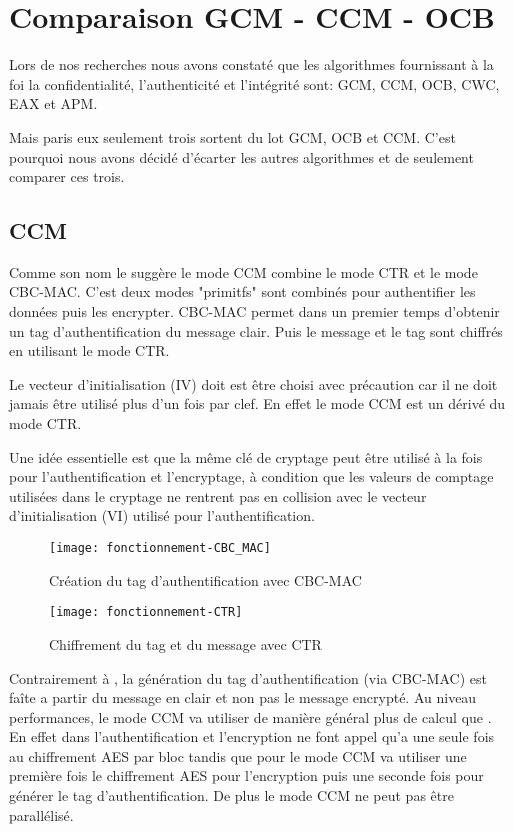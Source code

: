 \chapter{Comparaison GCM - CCM - OCB}

Lors de nos recherches nous avons constaté que les algorithmes fournissant à la foi la confidentialité, l'authenticité et l'intégrité sont: GCM, CCM, OCB, CWC, EAX et APM.

Mais paris eux seulement trois sortent du lot GCM, OCB et CCM. C'est pourquoi nous avons décidé d'écarter les autres algorithmes et de seulement comparer ces trois.

\section{CCM}

Comme son nom le suggère le mode CCM combine le mode CTR et le mode CBC-MAC. C'est deux modes "primitfs" sont combinés pour authentifier les données puis les encrypter. CBC-MAC permet dans un premier temps d'obtenir un tag d'authentification du message clair. Puis le message et le tag sont chiffrés en utilisant le mode CTR.



Le vecteur d'initialisation (IV) doit est être choisi avec précaution car il ne doit jamais être utilisé plus d'un fois par clef. En effet le mode CCM est un dérivé du mode CTR.



Une idée essentielle est que la même clé de cryptage peut être utilisé à la fois pour l'authentification et l'encryptage, à condition que les valeurs de comptage utilisées dans le cryptage ne rentrent pas en collision avec le vecteur d'initialisation (VI) utilisé pour l'authentification.


\begin{figure}[!h]
  \centering
  \texttt{[image: fonctionnement-CBC\_MAC]}
  \caption{Création du tag d'authentification avec CBC-MAC}
  \label{Création du tag d'authentification avec CBC-MAC}
\end{figure}

\begin{figure}[!h]
  \centering
  \texttt{[image: fonctionnement-CTR]}
  \caption{Chiffrement du tag et du message avec CTR}
  \label{Chiffrement du tag et du message avec CTR}
\end{figure}


Contrairement à \aes, la génération du tag d'authentification (via CBC-MAC) est faîte a partir du message en clair et non pas le message encrypté. Au niveau performances, le mode CCM va utiliser de manière général plus de calcul que \aes. En effet dans \aes l'authentification et l'encryption ne font appel qu'a une seule fois au chiffrement AES par bloc tandis que pour le mode CCM va utiliser une première fois le chiffrement AES pour l'encryption puis une seconde fois pour générer le tag d'authentification. De plus le mode CCM ne peut pas être parallélisé.


